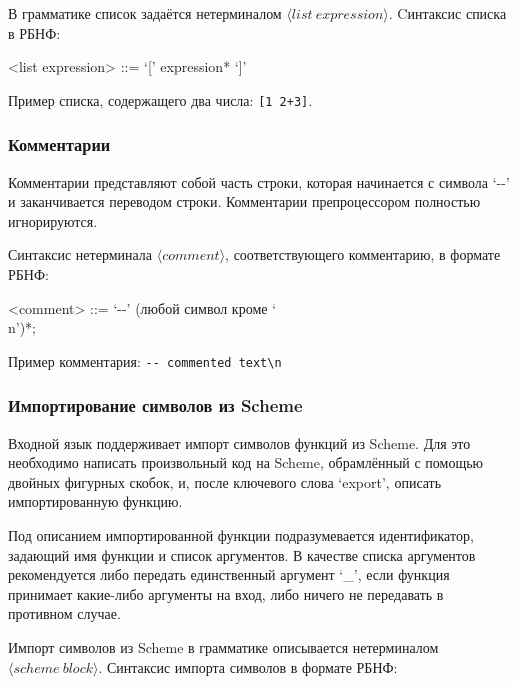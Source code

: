 \documentclass[12pt,a4paper,oneside]{extarticle}
\begin{document}
            В грамматике список задаётся нетерминалом $\langle list~expression \rangle$. Cинтаксис списка в РБНФ:
            \begin{grammar}
                <list expression> ::= `[' expression* `]'
            \end{grammar}

            Пример списка, содержащего два числа: \lstinline$[1 2+3]$.

        \subsubsection{Комментарии}
            Комментарии представляют собой часть строки, которая начинается с символа `-\null-' и заканчивается переводом строки.
            Комментарии препроцессором полностью игнорируются.

            Синтаксис нетерминала $\langle comment \rangle$, соответствующего комментарию, в формате РБНФ:

            \begin{grammar}
                <comment> ::= `-\null-' (любой символ кроме `\\n')*;
            \end{grammar}

            Пример комментария: \lstinline$-- commented text\n$
            

        \subsubsection{Импортирование символов из Scheme}
            Входной язык поддерживает импорт символов функций из Scheme.
            Для это необходимо написать произвольный код на Scheme, обрамлённый с помощью двойных фигурных скобок, и, после ключевого слова `export', описать импортированную функцию.

            Под описанием импортированной функции подразумевается идентификатор, задающий имя функции и список аргументов.
            В качестве списка аргументов рекомендуется либо передать единственный аргумент `\_', если функция принимает какие-либо аргументы на вход, либо ничего не передавать в противном случае.

            Импорт символов из Scheme в грамматике описывается нетерминалом $\langle scheme~block \rangle$. Синтаксис импорта символов в формате РБНФ:            
            \begin{grammar}
                <scheme block> ::= <SCHEME BODY> `export' <IDENTIFIER> <function arguments> 

                <SCHEME BODY> ::= `{{' (любой символ кроме `}')* `}}'
            \end{grammar}
\end{document}
